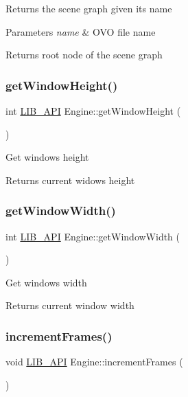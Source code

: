 Returns the scene graph given its name 
\begin{DoxyParams}{Parameters}
{\em name} & O\+VO file name \\
\hline
\end{DoxyParams}
\begin{DoxyReturn}{Returns}
root node of the scene graph 
\end{DoxyReturn}
\mbox{\label{classEngine_a483d0d99c1f762f0012aa649ec3220cf}} 
\subsubsection{\texorpdfstring{get\+Window\+Height()}{getWindowHeight()}}
{\footnotesize\ttfamily int \hyperlink{Engine_8h_a77278c8cc96e39fb27b5d0a347c8fb3d}{L\+I\+B\+\_\+\+A\+PI} Engine\+::get\+Window\+Height (\begin{DoxyParamCaption}{ }\end{DoxyParamCaption})}

Get windows height \begin{DoxyReturn}{Returns}
current widows height 
\end{DoxyReturn}
\mbox{\label{classEngine_aa9edd591eafe0975a95ab06f74b6ba03}} 
\subsubsection{\texorpdfstring{get\+Window\+Width()}{getWindowWidth()}}
{\footnotesize\ttfamily int \hyperlink{Engine_8h_a77278c8cc96e39fb27b5d0a347c8fb3d}{L\+I\+B\+\_\+\+A\+PI} Engine\+::get\+Window\+Width (\begin{DoxyParamCaption}{ }\end{DoxyParamCaption})}

Get windows width \begin{DoxyReturn}{Returns}
current window width 
\end{DoxyReturn}
\mbox{\label{classEngine_a1c8aef3cc4613f7c47698653ef6e3931}} 
\subsubsection{\texorpdfstring{increment\+Frames()}{incrementFrames()}}
{\footnotesize\ttfamily void \hyperlink{Engine_8h_a77278c8cc96e39fb27b5d0a347c8fb3d}{L\+I\+B\+\_\+\+A\+PI} Engine\+::increment\+Frames (\begin{DoxyParamCaption}{ }\end{DoxyParamCaption})}

